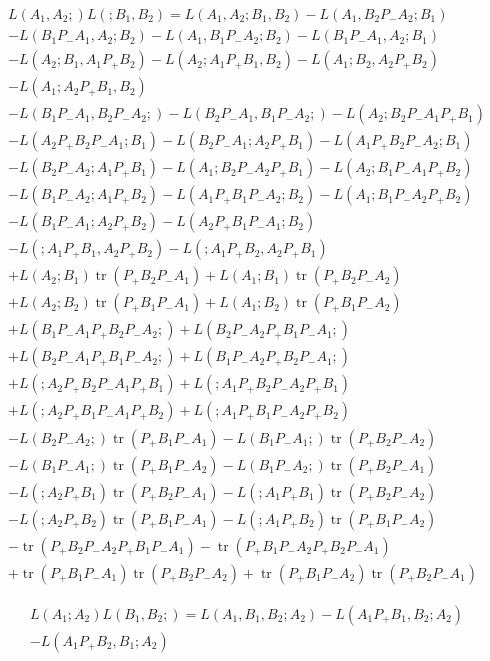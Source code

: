 \documentclass[b5paper,draft,openbib,12pt]{memoir}
\DeclareMathOperator{\tr}{tr}
\begin{document}
\begin{multline}
L(A_1,A_2;)L(;B_1,B_2)= L(A_1,A_2;B_1,B_2) - L(A_1,B_2P_-A_2;B_1)\\
-L(B_1P_-A_1,A_2;B_2)-L(A_1,B_1P_-A_2;B_2) - L(B_1P_-A_1,A_2;B_1)\\
-L(A_2;B_1,A_1P_+B_2)-L(A_2;A_1P_+B_1,B_2)-L(A_1;B_2,A_2P_+B_2)\\
-L(A_1;A_2P_+B_1,B_2)\\
-L(B_1P_-A_1,B_2P_-A_2;) - L(B_2P_-A_1,B_1P_-A_2;) - L(A_2;B_2P_-A_1P_+B_1)\\
-L(A_2P_+B_2P_-A_1;B_1)- L(B_2P_-A_1;A_2P_+B_1)- L(A_1P_+B_2P_-A_2;B_1)\\
-L(B_2P_-A_2;A_1P_+B_1) - L(A_1;B_2P_-A_2P_+B_1)-L(A_2;B_1P_-A_1P_+B_2)\\
-L(B_1P_-A_2;A_1P_+B_2) - L(A_1P_+B_1P_-A_2;B_2) - L(A_1;B_1P_-A_2P_+B_2)\\
-L(B_1P_-A_1;A_2P_+B_2) - L(A_2P_+B_1P_-A_1;B_2)\\
- L(;A_1P_+B_1,A_2P_+B_2)-L(;A_1P_+B_2,A_2P_+B_1)\\
+L(A_2;B_1)\tr(P_+B_2P_-A_1) + L(A_1;B_1)\tr(P_+B_2P_-A_2) \\
+L(A_2;B_2)\tr(P_+B_1P_-A_1) + L(A_1;B_2)\tr(P_+B_1P_-A_2)\\
+L(B_1P_-A_1P_+B_2P_-A_2;) + L(B_2P_-A_2P_+B_1P_-A_1;) \\
+ L(B_2P_-A_1P_+B_1P_-A_2;)+ L(B_1P_-A_2P_+B_2P_-A_1;)\\
+L(;A_2P_+B_2P_-A_1P_+B_1) + L(;A_1P_+B_2P_-A_2P_+B_1)\\
+L(;A_2P_+B_1P_-A_1P_+B_2) + L(;A_1P_+B_1P_-A_2P_+B_2)\\
-L(B_2P_-A_2;)\tr(P_+B_1P_-A_1) - L(B_1P_-A_1;)\tr(P_+B_2P_-A_2)\\
-L(B_1P_-A_1;)\tr(P_+B_1P_-A_2) -L(B_1P_-A_2;)\tr(P_+B_2P_-A_1)\\
-L(;A_2P_+B_1)\tr(P_+B_2P_-A_1) - L(;A_1P_+B_1)\tr(P_+B_2P_-A_2)\\
-L(;A_2P_+B_2)\tr(P_+B_1P_-A_1) - L(;A_1P_+B_2)\tr(P_+B_1P_-A_2)\\
-\tr(P_+B_2P_-A_2P_+B_1P_-A_1) -\tr(P_+B_1P_-A_2P_+B_2P_-A_1)\\
+\tr(P_+B_1P_-A_1) \tr(P_+B_2P_-A_2) + \tr(P_+B_1P_-A_2)\tr(P_+B_2P_-A_1)
\end{multline}

\begin{multline}
L(A_1;A_2)L(B_1,B_2;)=L(A_1,B_1,B_2;A_2) - L(A_1P_+B_1,B_2;A_2)\\
 - L(A_1P_+B_2,B_1;A_2)
\end{multline}
\end{document}
